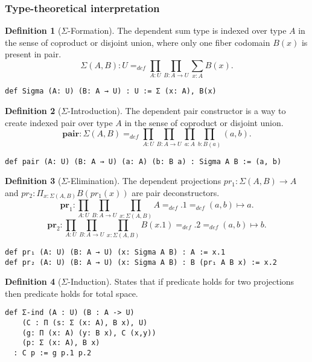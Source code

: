 \documentclass{article}
\theoremstyle{definition}
\newtheorem{definition}{Definition}
\begin{document}
\subsubsection*{Type-theoretical interpretation}

\begin{definition}[$\Sigma$-Formation]
The dependent sum type is indexed over type $A$ in the sense of coproduct or disjoint union,
where only one fiber codomain $B(x)$ is present in pair.
$$
   \Sigma(A,B) : U =_{def} \prod_{A:U}\prod_{B: A \rightarrow U }\sum_{x:A} B(x).
$$
\begin{lstlisting}[mathescape=true]
def Sigma (A: U) (B: A → U) : U := Σ (x: A), B(x)
\end{lstlisting}
\end{definition}

\begin{definition} [$\Sigma$-Introduction]
The dependent pair constructor is a way to create indexed pair over type $A$
in the sense of coproduct or disjoint union.
$$
  \mathbf{pair} : \Sigma(A,B) =_{def} \prod_{A:U}\prod_{B:A \rightarrow U}\prod_{a:A}\prod_{b:B(a)} (a,b).
$$
\begin{lstlisting}
def pair (A: U) (B: A → U) (a: A) (b: B a) : Sigma A B := (a, b)
\end{lstlisting}
\end{definition}

\begin{definition} [$\Sigma$-Elimination]
The dependent projections
$pr_{1}: \Sigma(A,B) \rightarrow A$ and
$pr_{2}: \Pi_{x: \Sigma(A,B)} B(pr_{1}(x))$ are pair deconstructors.
$$
  \mathbf{pr}_1 : \prod_{A:U} \prod_{B:A \rightarrow U} \prod_{x: \Sigma(A,B)} A
  =_{def} .1 =_{def} (a,b) \mapsto a.
$$
$$
  \mathbf{pr}_2 : \prod_{A:U} \prod_{B:A \rightarrow U} \prod_{x: \Sigma(A,B)} B(x.1)
  =_{def} .2 =_{def} (a,b) \mapsto b.
$$
\begin{lstlisting}[mathescape=true]
def pr₁ (A: U) (B: A → U) (x: Sigma A B) : A := x.1
def pr₂ (A: U) (B: A → U) (x: Sigma A B) : B (pr₁ A B x) := x.2
\end{lstlisting}
\end{definition}

\begin{definition} [$\Sigma$-Induction]
States that if predicate holds for two projections
then predicate holds for total space.
\begin{lstlisting}[mathescape=true]
def Σ-ind (A : U) (B : A -> U)
    (C : Π (s: Σ (x: A), B x), U)
    (g: Π (x: A) (y: B x), C (x,y))
    (p: Σ (x: A), B x)
  : C p := g p.1 p.2
\end{lstlisting}
\end{definition}
\end{document}
